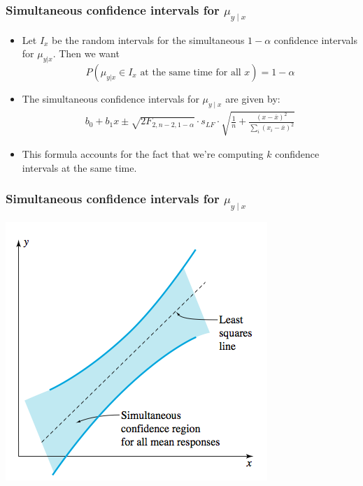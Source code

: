 \documentclass[handout]{beamer}\usepackage[]{graphicx}\usepackage[]{color}
\providecommand{\ov}[1]{\overline{#1}}
\numberwithin{equation}{section}
\begin{document}
\begin{frame}
\frametitle{Simultaneous confidence intervals for $\mu_{y \mid x}$}
\begin{itemize}
\item 
Let $I_x$ be the random intervals for the simultaneous $1 - \alpha$ confidence intervals for $\mu_{y|x}$. Then we want
\[P(\mbox{$\mu_{y|x} \in I_x$ at the same time for all $x$}) = 1 - \alpha\]
\item The simultaneous confidence intervals for $\mu_{y \mid x}$ are given by:
\pause \begin{align*}
b_0 + b_1 x \pm \sqrt{2 F_{2, n-2, 1 - \alpha}} \cdot s_{LF} \cdot \sqrt{ \frac{1}{n} + \frac{(x - \ov{x})^2}{\sum_i(x_i - \ov{x})^2}}
\end{align*}
\pause \item This formula accounts for the fact that we're computing $k$ confidence intervals at the same time.
\end{itemize}
\end{frame}

\begin{frame}
\frametitle{Simultaneous confidence intervals for $\mu_{y \mid x}$}
 \includegraphics{../../fig/simconf.png}
\end{frame}
\end{document}
